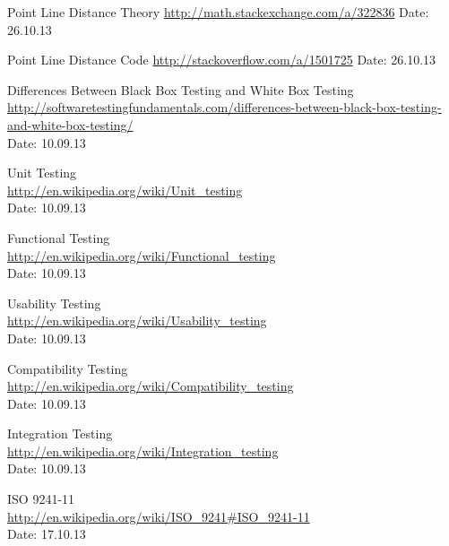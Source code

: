 \begin{thebibliography}{99}
	Point Line Distance Theory\newline
	\href {http://math.stackexchange.com/a/322836}{http://math.stackexchange.com/a/322836}\newline
	Date: 26.10.13

	Point Line Distance Code\newline
	\href {http://stackoverflow.com/a/1501725}{http://stackoverflow.com/a/1501725}\newline
	Date: 26.10.13

	Differences Between Black Box Testing and White Box Testing \\
	\href {http://softwaretestingfundamentals.com/differences-between-black-box-testing-and-white-box-testing/}{http://softwaretestingfundamentals.com/differences-between-black-box-testing-and-white-box-testing/} \\
	Date: 10.09.13

	Unit Testing \\
	\href {http://en.wikipedia.org/wiki/Unit_testing}{http://en.wikipedia.org/wiki/Unit\_testing} \\
	Date: 10.09.13

	Functional Testing \\
	\href {http://en.wikipedia.org/wiki/Functional_testing}{http://en.wikipedia.org/wiki/Functional\_testing} \\
	Date: 10.09.13

	Usability Testing \\
	\href {http://en.wikipedia.org/wiki/Usability_testing}{http://en.wikipedia.org/wiki/Usability\_testing} \\
	Date: 10.09.13

	Compatibility Testing \\
	\href {http://en.wikipedia.org/wiki/Compatibility_testing}{http://en.wikipedia.org/wiki/Compatibility\_testing} \\
	Date: 10.09.13

	Integration Testing \\
	\href{http://en.wikipedia.org/wiki/Integration_testing}{http://en.wikipedia.org/wiki/Integration\_testing} \\
	Date: 10.09.13

	ISO 9241-11 \\
	\href {http://en.wikipedia.org/wiki/ISO_9241#ISO_9241-11}{http://en.wikipedia.org/wiki/ISO\_9241\#ISO\_9241-11} \\
	Date: 17.10.13


\end{thebibliography}
